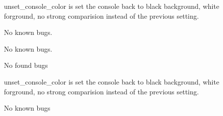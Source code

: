 
\begin{DoxyRefList}
\item[\label{bug__bug000001}%
\hypertarget{bug__bug000001}{}%
File \hyperlink{color_8h}{color.h} ]unset\+\_\+console\+\_\+color is set the console back to black background, white forground, no strong comparision instead of the previous setting.  
\item[\label{bug__bug000002}%
\hypertarget{bug__bug000002}{}%
File \hyperlink{config_8h}{config.h} ]No known bugs.  
\item[\label{bug__bug000003}%
\hypertarget{bug__bug000003}{}%
File \hyperlink{equation_8h}{equation.h} ]No known bugs.  
\item[\label{bug__bug000004}%
\hypertarget{bug__bug000004}{}%
File \hyperlink{iif_8h}{iif.h} ]No found bugs  
\item[\label{bug__bug000005}%
\hypertarget{bug__bug000005}{}%
File \hyperlink{iif__assert_8h}{iif\+\_\+assert.h} ]unset\+\_\+console\+\_\+color is set the console back to black background, white forground, no strong comparision instead of the previous setting.  
\item[\label{bug__bug000006}%
\hypertarget{bug__bug000006}{}%
File \hyperlink{instrumentation_8h}{instrumentation.h} ]No known bugs  
\item[\label{bug__bug000007}%
\hypertarget{bug__bug000007}{}%
File \hyperlink{ml__algo_8h}{ml\+\_\+algo.h} ]
\end{DoxyRefList}